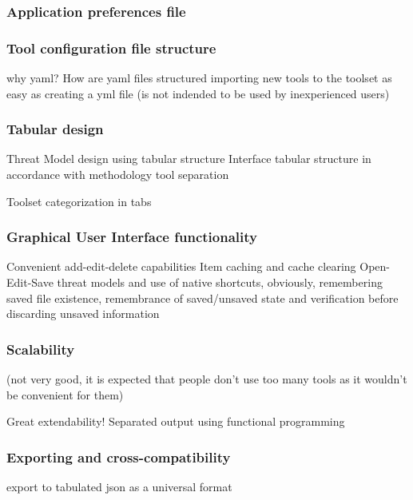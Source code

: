 	\subsubsection{Application preferences file}
	
	
	\subsubsection{Tool configuration file structure}
	why yaml? How are yaml files structured
	importing new tools to the toolset as easy as creating a yml file (is not indended to be used by inexperienced users)


	\subsubsection{Tabular design}
	Threat Model design using tabular structure 
	Interface tabular structure in accordance with methodology tool separation
	
	Toolset categorization in tabs 
	
	
	\subsubsection{Graphical User Interface functionality}
	Convenient add-edit-delete capabilities
	Item caching and cache clearing
	Open-Edit-Save threat models and use of native shortcuts, obviously, remembering saved file existence, remembrance of saved/unsaved state and verification before discarding unsaved information
	
	
	\subsubsection{Scalability}
	(not very good, it is expected that people don't use too many tools as it wouldn't be convenient for them)
	
	Great extendability! Separated output using functional programming


	\subsubsection{Exporting and cross-compatibility}
	 export to tabulated json as a universal format

